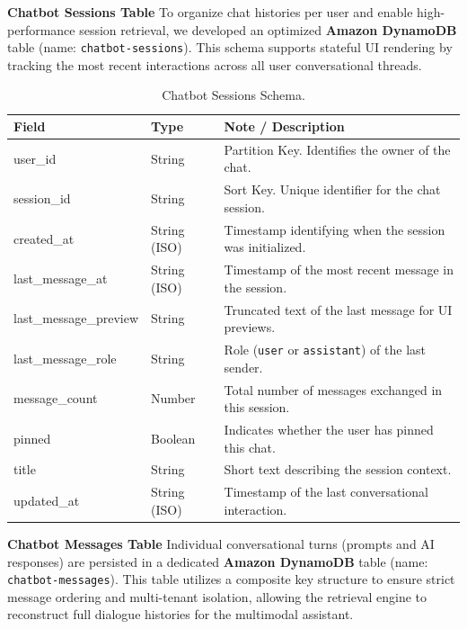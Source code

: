 \newpage

\textbf{Chatbot Sessions Table}
To organize chat histories per user and enable high-performance session retrieval, we developed an optimized \textbf{Amazon DynamoDB} table (name: \texttt{chatbot-sessions}). This schema supports stateful UI rendering by tracking the most recent interactions across all user conversational threads.

\begin{table}[H]
    \centering
    \caption{Chatbot Sessions Schema.}
    \label{tab:chat_sessions}
    \begin{tabular}{llp{8cm}}
        \toprule
        \textbf{Field} & \textbf{Type} & \textbf{Note / Description} \\
        \midrule
        user\_id & String & Partition Key. Identifies the owner of the chat. \\
        session\_id & String & Sort Key. Unique identifier for the chat session. \\
        \midrule
        created\_at & String (ISO) & Timestamp identifying when the session was initialized. \\
        last\_message\_at & String (ISO) & Timestamp of the most recent message in the session. \\
        last\_message\_preview & String & Truncated text of the last message for UI previews. \\
        last\_message\_role & String & Role (\texttt{user} or \texttt{assistant}) of the last sender. \\
        message\_count & Number & Total number of messages exchanged in this session. \\
        pinned & Boolean & Indicates whether the user has pinned this chat. \\
        title & String & Short text describing the session context. \\
        updated\_at & String (ISO) & Timestamp of the last conversational interaction. \\
        \bottomrule
    \end{tabular}
\end{table}

\newpage

\textbf{Chatbot Messages Table}
Individual conversational turns (prompts and AI responses) are persisted in a dedicated \textbf{Amazon DynamoDB} table (name: \texttt{chatbot-messages}). This table utilizes a composite key structure to ensure strict message ordering and multi-tenant isolation, allowing the retrieval engine to reconstruct full dialogue histories for the multimodal assistant.

